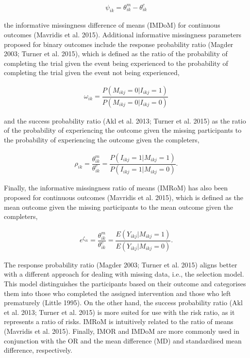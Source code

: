 \[\begin{aligned}
\psi_{ik} = \theta^{m}_{ik} - \theta^{c}_{ik}
\end{aligned}\]

the informative missingness difference of means (IMDoM) for continuous outcomes
(Mavridis et al. 2015). Additional informative missingness parameters proposed
for binary outcomes include the response probability ratio (Magder 2003; Turner et al. 2015), which is
defined as the ratio of the probability of completing the trial given the event
being experienced to the probability of completing the trial given the event
not being experienced,

\[\begin{aligned}
\omega_{ik} = \dfrac{P(M_{ikj} = 0 | I_{ikj} = 1)}{P(M_{ikj} = 0 | I_{ikj} = 0)}
\end{aligned}\]

and the success probability ratio (Akl et al. 2013; Turner et al. 2015) as the ratio of the
probability of experiencing the outcome given the missing participants to the
probability of experiencing the outcome given the completers,

\[\begin{aligned}
\rho_{ik} = \dfrac{\theta^{m}_{ik}}{\theta^{c}_{ik}} = \dfrac{P(I_{ikj} = 1 | M_{ikj} = 1)}{P(I_{ikj} = 1 | M_{ikj} = 0)}.
\end{aligned}\]

Finally, the informative missingness ratio of means (IMRoM) has also been proposed
for continuous outcomes (Mavridis et al. 2015), which is defined as the mean outcome given the
missing participants to the mean outcome given the completers,

\[\begin{aligned}
e^{\zeta_{ik}} = \dfrac{\theta^{m}_{ik}}{\theta^{c}_{ik}} = \dfrac{E(Y_{ikj} | M_{ikj} = 1)}{E(Y_{ikj} | M_{ikj} = 0)}.
\end{aligned}\]

The response probability ratio (Magder 2003; Turner et al. 2015) aligns better with a different approach for dealing with missing data, i.e., the selection model. This model distinguishes the participants based on their outcome and categorises them into those who completed the assigned intervention and those who left prematurely (Little 1995). On the other hand, the success probability ratio (Akl et al. 2013; Turner et al. 2015) is more suited for use with the risk ratio, as it represents a ratio of risks. IMRoM is intuitively related to the ratio of means (Mavridis et al. 2015). Finally, IMOR and IMDoM are more commonly used in conjunction with the OR and the mean difference (MD) and standardised mean difference, respectively.

